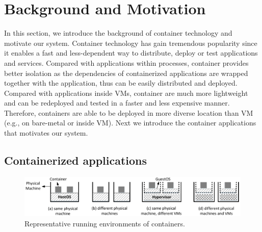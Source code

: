 \section{Background and Motivation}
\label{sec:motivation}

In this section, we introduce the background of container technology and motivate our system.
Container technology has gain tremendous popularity since it enables a fast and less-dependent
way to distribute, deploy or test applications and services.
Compared with applications within processes, container provides better isolation as the dependencies of containerized applications are
wrapped together with the application, thus can be easily distributed and deployed.
Compared with applications inside VMs, container are much more lightweight and can be redeployed and tested in a faster and
less expensive manner. Therefore, containers are able to be deployed in more diverse location than VM
(e.g., on bare-metal or inside VM).
Next we introduce the container applications that motivates our system.

\subsection{Containerized applications}

\begin{figure}[h]  
	\centering   
	\includegraphics[width=6.7in]{figures/deployment-cases}   
	\caption{\label{fig:deploy-cases} Representative running environments of containers.}   
\end{figure}


